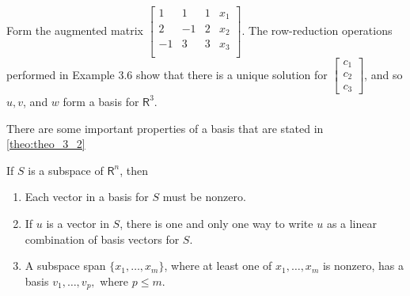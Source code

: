 \documentclass[../main.tex]{subfiles}
\begin{document}
Form the augmented matrix
$\left[\begin{array}{ccc|c}
1 & 1 & 1 & x_{1}\\
2 & -1 & 2 & x_{2}\\
-1 & 3 & 3 & x_{3}\\
\end{array}\right]$. The row-reduction operations performed in Example 3.6 show that there is a unique solution for
$\left[\begin{array}{c}
c_{1}\\
c_{2}\\
c_{3}
\end{array}\right]$, and so $u, v$, and $w$ form a basis for $\mathsf{R}^{3}$.

There are some important properties of a basis that are stated in  \autoref{theo:theo_3_2}

\begin{theorem}
	\label{theo:theo_3_2}
	If $S$ is a subspace of $\mathsf{R}^{n}$, then

	\begin{enumerate}[label=\textbf{\arabic*. }, noitemsep]
	\item Each vector in a basis for $S$ must be nonzero.
	\item If $u$ is a vector in $S$, there is one and only one way to write $u$ as a linear combination of basis vectors for $S$.
	\item A subspace span $\{x_1, \ldots ,x_m\}$, where at least one of $x_1, \ldots ,x_m$ is nonzero, has a basis $v_1, \ldots ,v_p,$ where $p \leq m.$
	\end{enumerate}
\end{theorem}
\end{document}
